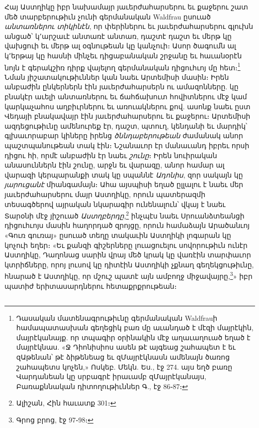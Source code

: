 \documentclass{article}
\begin{document}
{Հայ Աստղիկը իբր նախամայր յաւերժահարսերու եւ քաջերու շատ մեծ տարբերութիւն չունի գերմանական Waldfrau ըսուած \emph{անտառներու տիկինէն}, որ փերիներու եւ յաւերժահարսերու գլուխն անցած՝ կ՚արշաւէ անտառէ անտառ, դաշտէ դաշտ եւ մերթ կը վախցուի եւ մերթ ալ օգնութեան կը կանչուի։ Ասոր ծագումն ալ կ՚երթայ կը հասնի մինչեւ դիցաբանական շրջանը եւ հաւանօրէն նոյն է գերակշիռ դիրք վայելող գերմանական դիցուհւոյ մը հետ։\footnote{Դասական մատենագրութիւնը գերմանական Waldfrauի համապատասխան գեղեցիկ բառ մը աւանդած է մէզի մայրէկին, մայրէկանայք. որ տպագիր օրինակին մէջ աղաւաղուած եղած է մայրէկնաս. «Ջ Դիոնիսիոս ասեն թէ այգեաց շահապետ է եւ զԱթենան՝ թէ ձիթենեաց եւ զՄայրէկնասն ամենայն ծառոց շահապետս կոչեն,» Ոսկեբ. Մեկն. Ես., էջ 274. այս եղծ բառը Վարդանեան կը սրբագրէ իրաւամբ զՄայրէկանայս, Բառաքննական դիտողութիւններ Գ., էջ 86֊87։} Նման յիշատակութիւններ կան նաեւ Արտեմիսի մասին։ Իրեն անբաժին ընկերներն էին յաւերժահարսերն ու ամազոնները. կը բնակէր աւելի անտառներու եւ ճահճախուտ հովիտներու մէջ կամ կարկաչահոս աղբիւրներու եւ առուակներու քով. ասոնք նաեւ ըստ Վեդայի բնակավայր էին յաւերժահարսերու եւ քաջերու։ Արտեմիսի ազդեցութիւնը ամենուրեք էր, դաշտ, պտուղ, կենդանի եւ մարդիկ՝ գլխաւորաբար կիները իրենց \emph{ծննդաբերութեան} ժամանակ անոր պաշտպանութեան տակ էին։ Նշանաւոր էր մանաւանդ իբրեւ որսի դիցու հի, որմէ անբաժին էր նաեւ \emph{շունը}։ Իրեն նուիրական անասուններն էին շունը, արջն եւ վարազը, անոր համար ալ վարազի կերպարանքի տակ կը սպաննէ \emph{Ադոնիս}, զոր սակայն կը \emph{յարուցանէ} միանգամայն։ Ահա այսպիսի եղած ըլլալու է նաեւ մեր յաւերժահարսերու մայր Աստղիկը, որուն պատերազմի տեսագծերով այրական նկարագիր ունենալուն՝ վկայ է նաեւ Տարօնի մէջ յիշուած \emph{Աստղբերդը},\footnote{Ալիշան, Հին հաւատք 301։} ինչպէս նաեւ Սրուանձտեանցի դիցուհւոյս մասին հաղորդած զրոյցը, որուն համաձայն Արածանւոյ «Գուռ գուռայ» ըսուած տեղը տակաւին Աստղիկի լոգարան կը կոչուի եղեր։ «Եւ քանզի գիշերները լուացուելու սովորութիւն ունէր Աստղիկը, Դաղոնաց սարին վրայ մեծ կրակ կը վառէին տարփաւոր կտրիճները, որոյ լուսով կը դիտէին Աստղիկի չքնաղ գեղեկցութիւնը, հնարած է Աստղիկը, որ մշուշ պատէ այն ամբողջ միջավայրը,\footnote{Գրոց բրոց, էջ 97֊98։}» իբր պատիժ երիտասարդներու հետաքրքրութեան։}
\clearpage
\subsection{}
\end{document}
